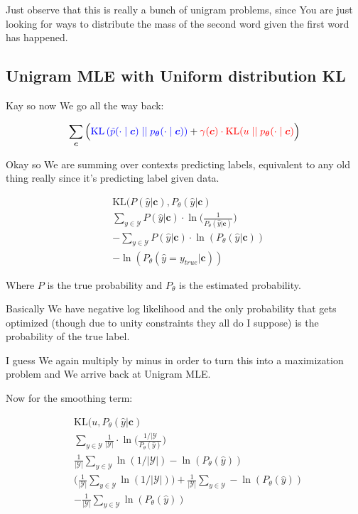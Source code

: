 \documentclass{article}
\newcommand{\KL}{\mathrm{KL}}
\newcommand{\uniform}{u}
\newcommand{\vtheta}{\boldsymbol{\theta}}
\newcommand{\model}{p_{\vtheta}}
\newcommand{\context}{\boldsymbol{c}}
\begin{document}
		Just observe that this is really a bunch of unigram problems, since You are just looking for ways to distribute the mass of the second word given the first word has happened.
		
	\subsection{Unigram MLE with Uniform distribution KL}
	
		Kay so now We go all the way back:
		
		\begin{align}
	  	 \sum_{\context} \Big( {\color{blue} \KL\left(\tilde{p}(\cdot 			\mid \context) \mid\mid \model(\cdot \mid \context)					\right)} + {\color{red}\gamma(\context) \cdot 						\KL(\uniform \mid\mid \model(\cdot \mid \context)}\Big)
		\end{align}
		
		Okay so We are summing over contexts predicting labels, equivalent to any old thing really since it's predicting label given data.
		
		\begin{align}
			&\KL(P(\hat{y}|\context), P_\theta(\hat{y}|\context)\\
			&\sum_{y\in\mathcal{Y}} P(\hat{y}|\context )\cdot\ln\bigg(\frac{1}{P_\theta(\hat{y}|\context)} \bigg)\\
			& - \sum_{y\in\mathcal{Y}} P(\hat{y}|\context )\cdot\ln(P_\theta(\hat{y}|\context))\\
			& -\ln(P_\theta(\hat{y} = y_{true}|\context))
		\end{align}
		
		Where $P$ is the true probability and $P_\theta$ is the estimated probability.
		
		Basically We have negative log likelihood and the only probability that gets optimized (though due to unity constraints they all do I suppose) is the probability of the true label.
		
		I guess We again multiply by minus in order to turn this into a maximization problem and We arrive back at Unigram MLE.
		
		Now for the smoothing term:
		
		\begin{align}
			& \KL(u, P_\theta(\hat{y}|\context)\\
			& \sum_{y\in\mathcal{Y}} \frac{1}{|\mathcal{Y}|} \cdot \ln\bigg(\frac{1/|\mathcal{Y}}{P_\theta(\hat{y})} \bigg)\\
			& \frac{1}{|\mathcal{Y}|} \sum_{y\in\mathcal{Y}}   \ln(1/|\mathcal{Y}|) - \ln(P_\theta(\hat{y}) )\\
			& \bigg(\frac{1}{|\mathcal{Y}|} \sum_{y\in\mathcal{Y}}   \ln(1/|\mathcal{Y}|)\bigg)  + \frac{1}{|\mathcal{Y}|} \sum_{y\in\mathcal{Y}} - \ln(P_\theta(\hat{y}) )\\
			& - \frac{1}{|\mathcal{Y}|} \sum_{y\in\mathcal{Y}} \ln(P_\theta(\hat{y}) )\\
		\end{align}
		
\end{document}
